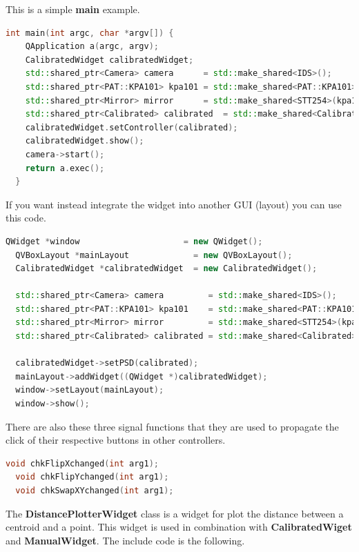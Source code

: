 This is a simple \textbf{main} example.

\begin{lstlisting}[language=c++, gobble=2]
  int main(int argc, char *argv[]) {
    QApplication a(argc, argv);
    CalibratedWidget calibratedWidget;
    std::shared_ptr<Camera> camera      = std::make_shared<IDS>();
    std::shared_ptr<PAT::KPA101> kpa101 = std::make_shared<PAT::KPA101>();
    std::shared_ptr<Mirror> mirror      = std::make_shared<STT254>(kpa101);
    std::shared_ptr<Calibrated> calibrated  = std::make_shared<Calibrated>(mirror, camera->getFrame()->getCentroid(), camera->getFrame()->getTarget());
    calibratedWidget.setController(calibrated);
    calibratedWidget.show();
    camera->start();
    return a.exec();
  }
\end{lstlisting}

If you want instead integrate the widget into another GUI (layout) you
can use this code.

\begin{lstlisting}[language=c++, gobble=2]
  QWidget *window                     = new QWidget();
  QVBoxLayout *mainLayout             = new QVBoxLayout();
  CalibratedWidget *calibratedWidget  = new CalibratedWidget();
  
  std::shared_ptr<Camera> camera         = std::make_shared<IDS>();
  std::shared_ptr<PAT::KPA101> kpa101    = std::make_shared<PAT::KPA101>();
  std::shared_ptr<Mirror> mirror         = std::make_shared<STT254>(kpa101);
  std::shared_ptr<Calibrated> calibrated = std::make_shared<Calibrated>(mirror, camera->getFrame()->getCentroid());
  
  calibratedWidget->setPSD(calibrated);
  mainLayout->addWidget((QWidget *)calibratedWidget);
  window->setLayout(mainLayout);
  window->show();
\end{lstlisting}

There are also these three signal functions that they are used to
propagate the click of their respective buttons in other controllers.

\begin{lstlisting}[language=c++, gobble=2]
  void chkFlipXchanged(int arg1);
  void chkFlipYchanged(int arg1);
  void chkSwapXYchanged(int arg1);
\end{lstlisting}


The \textbf{DistancePlotterWidget} class is a widget for plot the
distance between a centroid and a point. This widget is used in
combination with \textbf{CalibratedWiget} and \textbf{ManualWidget}. The
include code is the following.

